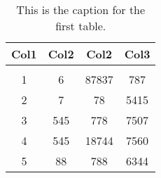 \begin{table}
	\centering
	\begin{tabular}{||c c c c||} 
		\hline
		Col1 & Col2 & Col2 & Col3 \\ [0.5ex] 
		\hline
		 & & & \\
		1 & 6 & 87837 & 787 \\ 
		2 & 7 & 78 & 5415 \\
		3 & 545 & 778 & 7507 \\
		4 & 545 & 18744 & 7560 \\
		5 & 88 & 788 & 6344 \\ [1ex] 
		\hline
	\end{tabular}
	\caption{This is the caption for the first table.}
	\label{table:1}
\end{table}
